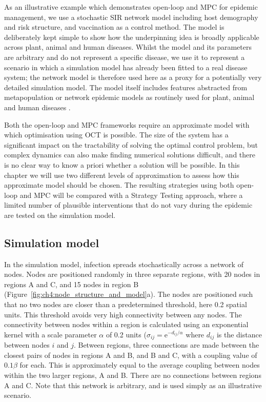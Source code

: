 As an illustrative example which demonstrates open-loop and MPC for epidemic management, we use a stochastic SIR network model including host demography and risk structure, and vaccination as a control method. The model is deliberately kept simple to show how the underpinning idea is broadly applicable across plant, animal and human diseases. Whilst the model and its parameters are arbitrary and do not represent a specific disease, we use it to represent a scenario in which a simulation model has already been fitted to a real disease system; the network model is therefore used here as a proxy for a potentially very detailed simulation model. The model itself includes features abstracted from metapopulation or network epidemic models as routinely used for plant, animal and human diseases \citep{rowthorn_optimal_2009, keeling_dynamics_2001, keeling_metapopulation_2000, margosian_connectivity_2009, bansal_individual_2007}.

Both the open-loop and MPC frameworks require an approximate model with which optimisation using OCT is possible. The size of the system has a significant impact on the tractability of solving the optimal control problem, but complex dynamics can also make finding numerical solutions difficult, and there is no clear way to know a priori whether a solution will be possible. In this chapter we will use two different levels of approximation to assess how this approximate model should be chosen. The resulting strategies using both open-loop and MPC will be compared with a Strategy Testing approach, where a limited number of plausible interventions that do not vary during the epidemic are tested on the simulation model. 

\subsection{Simulation model}

In the simulation model, infection spreads stochastically across a network of nodes. Nodes are positioned randomly in three separate regions, with 20 nodes in regions A and C, and 15 nodes in region B (Figure~\ref{fig:ch4:node_structure_and_model}a). The nodes are positioned such that no two nodes are closer than a predetermined threshold, here 0.2 spatial units. This threshold avoids very high connectivity between any nodes. The connectivity between nodes within a region is calculated using an exponential kernel with a scale parameter $\alpha$ of 0.2 units ($\sigma_{ij} = \mathrm{e}^{-d_{ij}/\alpha}$ where $d_{ij}$ is the distance between nodes $i$ and $j$. Between regions, three connections are made between the closest pairs of nodes in regions A and B, and B and C, with a coupling value of $0.1\beta$ for each. This is approximately equal to the average coupling between nodes within the two larger regions, A and B. There are no connections between regions A and C. Note that this network is arbitrary, and is used simply as an illustrative scenario.


